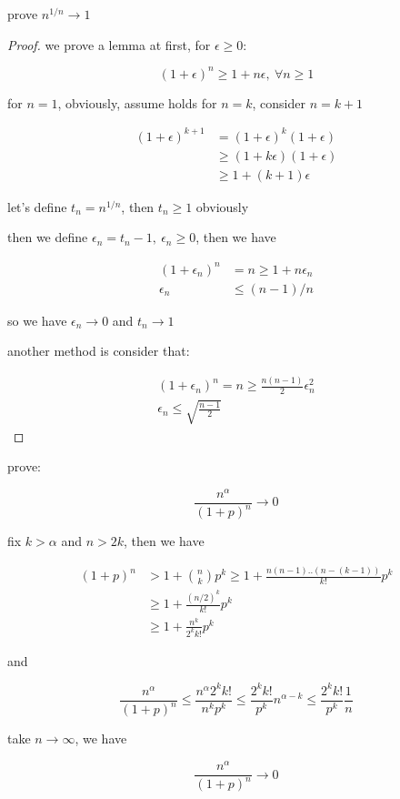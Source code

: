 \begin{exercise}
    prove $n^{1/n} \to 1$
\end{exercise}

\begin{proof}
    we prove a lemma at first, for $\epsilon \ge 0$:

    \[
        (1+\epsilon)^n \ge 1 + n\epsilon,\: \forall n \ge 1
    \]

    for $n =1$, obviously, assume holds for $n = k$, consider $n=k+1$

    \begin{align*}
        (1+\epsilon)^{k+1} & =(1+\epsilon)^k (1 + \epsilon)  \\
        & \ge (1+ k\epsilon)(1 + \epsilon) \\
        & \ge  1+ (k+1) \epsilon
    \end{align*}

    let's define $t_n = n^{1/n}$, then $t_n \ge 1$ obviously

    then we define $ \epsilon_n = t_n - 1,\: \epsilon_n \ge 0$, then we have

    \begin{align*}
        (1+\epsilon_n)^n &= n \ge 1 + n \epsilon_n \\
        \epsilon_n &\le (n-1)/n
    \end{align*}

    so we have $\epsilon_n \to 0$ and $t_n \to 1$
    
    another method is consider that:

    \begin{align*}
        (1+\epsilon_n)^n = n \ge \frac{n(n-1)}{2}\epsilon_n^2 \\
        \epsilon_n \le \sqrt{\frac{n-1}{2}}
    \end{align*}
\end{proof}

\begin{exercise}
    prove:

    \[
        \frac{n^{\alpha}}{(1+p)^n} \to 0
    \]

    fix $k > \alpha$ and $n > 2k$, then we have

    \begin{align*}
        (1+p)^n &> 1 + \binom{n}{k}p^k \ge 1 + \frac{n(n-1)..(n-(k-1))}{k!}p^k \\
        & \ge 1 + \frac{(n/2 )^k}{k!}p^k \\
        & \ge 1 + \frac{n^k}{2^k k!}p^k
    \end{align*}

    and 

    \[
        \frac{n^\alpha}{(1+p)^n} \le \frac{n^{\alpha} 2^k k!}{n^kp^k} \le \frac{2^k k!}{p^k} n^{\alpha - k} \le  \frac{2^k k!}{p^k} \frac{1}{n}
    \]

    take $n \to \infty$, we have

    \[
        \frac{n^\alpha}{(1+p)^n} \to 0
    \]
\end{exercise}

